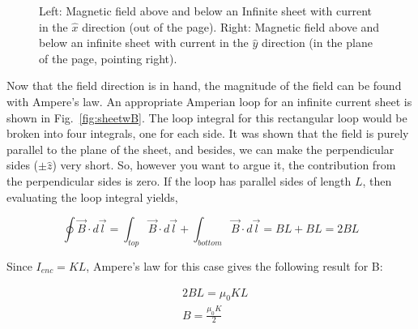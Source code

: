 \documentclass[12pt]{article}
\begin{document}
\begin{flushleft}
\begin{figure}[h]
\centering
{}
\hspace{1.6in}
\caption{\small Left: Magnetic field above and below an Infinite sheet with current in the $\hat{x}$ direction (out of the page).  Right: Magnetic field above and below an infinite sheet with current in the $\hat{y}$ direction (in the plane of the page, pointing right).}
\label{fig:Bdirect}
\end{figure}

Now that the field direction is in hand, the magnitude of the field can be found with Ampere's law.  An appropriate Amperian loop for an infinite current sheet is shown in Fig.~\ref{fig:sheetwB}.  The loop integral for this rectangular loop would be broken into four integrals, one for each side.  It was shown that the field is purely parallel to the plane of the sheet, and besides, we can make the perpendicular sides ($\pm \hat{z}$) very short.  So, however you want to argue it, the contribution from the perpendicular sides is zero.  If the loop has parallel sides of length $L$, then evaluating the loop integral yields,

\[
\oint \vec{B} \cdot d\vec{l} = \int_{top} \vec{B} \cdot d\vec{l} + \int_{bottom} \vec{B} \cdot d\vec{l}  = BL+BL = 2BL
\]

Since $I_{enc}=KL$, Ampere's law for this case gives the following result for B:

\begin{equation*}
\begin{aligned}
& 2BL = \mu_{0}KL \\
& B = \frac{\mu_{0}K}{2}
\end{aligned}
\end{equation*}


\end{flushleft}
\end{document}

